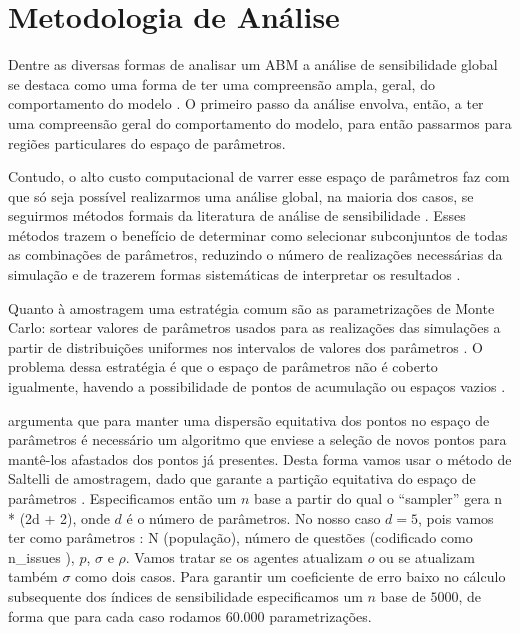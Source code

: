 \section{Metodologia de Análise}

Dentre as diversas formas de analisar um ABM a análise de sensibilidade global
se destaca como uma forma de ter uma compreensão ampla, geral, do comportamento
do modelo \cite{north2007managing}. O primeiro passo da análise envolva, então,
a ter uma compreensão geral do comportamento do modelo, para então passarmos
para regiões particulares do espaço de parâmetros.

Contudo, o alto custo computacional de varrer esse espaço de parâmetros faz com
que só seja possível realizarmos uma análise global, na maioria dos casos, se
seguirmos métodos formais da literatura de análise de sensibilidade
\cite{railsback2012agent}. Esses métodos trazem o benefício de determinar como
selecionar subconjuntos de todas as combinações de parâmetros, reduzindo o
número de realizações necessárias da simulação e de trazerem formas sistemáticas
de interpretar os resultados \cite{railsback2012agent}.

Quanto à amostragem uma estratégia comum são as parametrizações de Monte Carlo:
sortear valores de parâmetros usados para as realizações das simulações a partir
de distribuições uniformes nos intervalos de valores dos parâmetros
\cite{laver2011party}. O problema dessa estratégia é que o espaço de parâmetros
não é coberto igualmente, havendo a possibilidade de pontos de acumulação ou
espaços vazios \cite{pereda2017brief}.

 argumenta que para manter uma dispersão equitativa
dos pontos no espaço de parâmetros é necessário um algoritmo que enviese a
seleção de novos pontos para mantê-los afastados dos pontos já presentes. Desta
forma vamos usar o método de Saltelli de amostragem, dado que garante a partição
equitativa do espaço de parâmetros \cite{herman2017salib}. Especificamos então
um \(n\) base a partir do qual o ``sampler'' gera n * (2d + 2), onde \(d\) é o
número de parâmetros. No nosso caso \(d = 5\), pois vamos ter como parâmetros :
N (população), número de questões (codificado como n\_issues ), \(p\), \(\sigma\) e
\(\rho\). Vamos tratar se os agentes atualizam \(o\) ou se atualizam também \(\sigma\)
como dois casos. Para garantir um coeficiente de erro baixo no cálculo
subsequente dos índices de sensibilidade especificamos um \(n\) base de
\(5000\), de forma que para cada caso rodamos \(60.000\) parametrizações.


